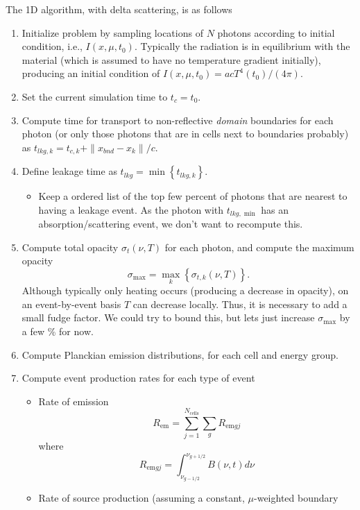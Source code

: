 \documentclass{article}
\newcommand{\ncl}{\ensuremath{N_{\text{cells}}}}
\newcommand{\Rem}{\ensuremath{R_{\text{em}}}}
\newcommand{\Remg}{\ensuremath{R_{\text{em}gj}}}
\begin{document}
The 1D algorithm, with delta scattering, is as follows
\begin{enumerate}
\item Initialize problem by sampling locations of $N$ photons according to
initial condition, i.e., $I(x,\mu,t_0)$.  Typically the radiation is in
equilibrium with the material (which is assumed to have no temperature gradient
initially), producing an initial condition of $I(x,\mu,t_0)
= acT^4(t_0)/(4\pi)$. 
\item Set the current simulation time to $t_{c}=t_0$.
\item Compute time for transport to non-reflective \emph{domain} boundaries 
for each photon (or only those photons that are in cells next to boundaries
probably) as $t_{lkg,k} = t_{c,k} + \|x_{bnd} - x_k\|/c$.  
\item Define leakage time as $t_{lkg} = \min\left\{t_{lkg,k}\right\}$.
\begin{itemize}
\item Keep a ordered list of the top few percent of photons that are nearest to having a
leakage event.  As the photon with $t_{lkg,\min}$ has an absorption/scattering event, we don't
want to recompute this.  
\end{itemize}
\item Compute total opacity $\sigma_t(\nu,T)$ for each photon, and compute the
maximum opacity
\begin{equation}
   \sigma_{\max} = \max_k\left\{\sigma_{t,k}(\nu,T)\right\}.
\end{equation}
Although typically only heating occurs (producing a decrease in opacity), on an
event-by-event basis $T$ can decrease locally.  Thus, it is necessary to add a
small fudge factor.  We could try to bound this, but lets just increase
$\sigma_{\max}$ by a few \% for now.  
\item Compute Planckian emission distributions, for each cell and energy group.
\item Compute event production rates for each type of event
\begin{itemize}
  \item Rate of emission
\begin{equation}
  \Rem = \sum_{j=1}^{\ncl} \sum_{g} \Remg
\end{equation}
where
\begin{equation}
  \Remg = \int_{\nu_{g-1/2}}^{\nu_{g+1/2}} B(\nu,t)  d \nu
\end{equation}
  \item Rate of source production (assuming a constant, $\mu$-weighted boundary

\end{itemize}
\end{enumerate}
\end{document}
